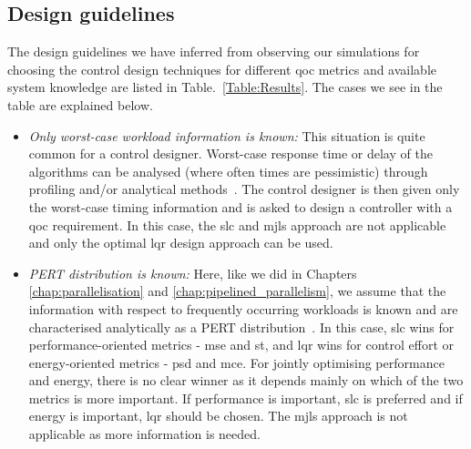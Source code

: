 \subsection{Design guidelines}
The design guidelines we have inferred from observing our simulations for choosing the control design techniques for different \gls{qoc} metrics and available system knowledge are listed in Table.~\ref{Table:Results}. The cases we see in the table are explained below.
\begin{itemize}
    \item \emph{Only worst-case workload information is known:}
    This situation is quite common for a control designer. Worst-case response time or delay of the algorithms can be analysed (where often times are pessimistic) through profiling and/or analytical methods~\cite{saidi2018future}. The control designer is then given only the worst-case timing information and is asked to design a controller with a \gls{qoc} requirement. In this case, the \gls{slc} and \gls{mjls} approach are not applicable and only the optimal \gls{lqr} design approach can be used. 
    
    \item \emph{PERT distribution is known:} Here, like we did in Chapters \ref{chap:parallelisation} and \ref{chap:pipelined_parallelism},  we assume that the information with respect to frequently occurring workloads is known and are characterised analytically as a PERT distribution~\cite{adyanthaya2014robustness}. In this case, \gls{slc} wins for performance-oriented metrics - \gls{mse} and \gls{st}, and \gls{lqr} wins for control effort or energy-oriented metrics - \gls{psd} and \gls{mce}. For jointly optimising performance and energy, there is no clear winner as it depends mainly on which of the two metrics is more important. If performance is important, \gls{slc} is preferred and if energy is important, \gls{lqr} should be chosen.
    The \gls{mjls} approach is not applicable as more information is needed.
    

\end{itemize}
